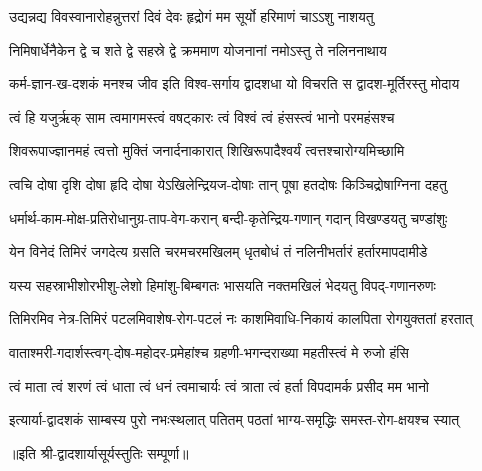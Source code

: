 

\twolineshloka
{उद्यन्नद्य विवस्वानारोहन्नुत्तरां दिवं देवः}
{हृद्रोगं मम सूर्यो हरिमाणं चाऽऽशु नाशयतु}%

\twolineshloka
{निमिषार्धेनैकेन द्वे च शते द्वे सहस्रे द्वे}
{क्रममाण योजनानां नमोऽस्तु ते नलिननाथाय}%

\twolineshloka
{कर्म-ज्ञान-ख-दशकं मनश्च जीव इति विश्व-सर्गाय}
{द्वादशधा यो विचरति स द्वादश-मूर्तिरस्तु मोदाय}%

\twolineshloka
{त्वं हि यजुर्ऋक् साम त्वमागमस्त्वं वषट्कारः}
{त्वं विश्वं त्वं हंसस्त्वं भानो परमहंसश्च}%

\twolineshloka
{शिवरूपाज्ज्ञानमहं त्वत्तो मुक्तिं जनार्दनाकारात्}
{शिखिरूपादैश्वर्यं त्वत्तश्चारोग्यमिच्छामि}%

\twolineshloka
{त्वचि दोषा दृशि दोषा हृदि दोषा येऽखिलेन्द्रियज-दोषाः}
{तान् पूषा हतदोषः किञ्चिद्रोषाग्निना दहतु}%

\twolineshloka
{धर्मार्थ-काम-मोक्ष-प्रतिरोधानुग्र-ताप-वेग-करान्}
{बन्दी-कृतेन्द्रिय-गणान् गदान् विखण्डयतु चण्डांशुः}%

\twolineshloka
{येन विनेदं तिमिरं जगदेत्य ग्रसति चरमचरमखिलम्}
{धृतबोधं तं नलिनीभर्तारं हर्तारमापदामीडे}%

\twolineshloka
{यस्य सहस्राभीशोरभीशु-लेशो हिमांशु-बिम्बगतः}
{भासयति नक्तमखिलं भेदयतु विपद्-गणानरुणः}%

\twolineshloka
{तिमिरमिव नेत्र-तिमिरं पटलमिवाशेष-रोग-पटलं नः}
{काशमिवाधि-निकायं कालपिता रोगयुक्ततां हरतात्}%

\twolineshloka
{वाताश्मरी-गदार्शस्त्वग्-दोष-महोदर-प्रमेहांश्च}
{ग्रहणी-भगन्दराख्या महतीस्त्वं मे रुजो हंसि}%

\twolineshloka
{त्वं माता त्वं शरणं त्वं धाता त्वं धनं त्वमाचार्यः}
{त्वं त्राता त्वं हर्ता विपदामर्क प्रसीद मम भानो}%

\twolineshloka
{इत्यार्या-द्वादशकं साम्बस्य पुरो नभःस्थलात् पतितम्}
{पठतां भाग्य-समृद्धिः समस्त-रोग-क्षयश्च स्यात्}%


॥इति श्री-द्वादशार्यासूर्यस्तुतिः सम्पूर्णा॥